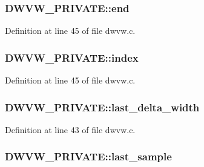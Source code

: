 \subsubsection[{\texorpdfstring{end}{end}}]{ D\+W\+V\+W\+\_\+\+P\+R\+I\+V\+A\+T\+E\+::end}\hypertarget{struct_d_w_v_w___p_r_i_v_a_t_e_ae13ae688a730d817b60480d55f5f114c}{}\label{struct_d_w_v_w___p_r_i_v_a_t_e_ae13ae688a730d817b60480d55f5f114c}


Definition at line 45 of file dwvw.\+c.

\subsubsection[{\texorpdfstring{index}{index}}]{ D\+W\+V\+W\+\_\+\+P\+R\+I\+V\+A\+T\+E\+::index}\hypertarget{struct_d_w_v_w___p_r_i_v_a_t_e_a0d919a53fe2f46ccd0823a684d42388e}{}\label{struct_d_w_v_w___p_r_i_v_a_t_e_a0d919a53fe2f46ccd0823a684d42388e}


Definition at line 45 of file dwvw.\+c.

\subsubsection[{\texorpdfstring{last\+\_\+delta\+\_\+width}{last_delta_width}}]{ D\+W\+V\+W\+\_\+\+P\+R\+I\+V\+A\+T\+E\+::last\+\_\+delta\+\_\+width}\hypertarget{struct_d_w_v_w___p_r_i_v_a_t_e_a18a3aa36273d607e568b4d61e725cb5d}{}\label{struct_d_w_v_w___p_r_i_v_a_t_e_a18a3aa36273d607e568b4d61e725cb5d}


Definition at line 43 of file dwvw.\+c.

\subsubsection[{\texorpdfstring{last\+\_\+sample}{last_sample}}]{ D\+W\+V\+W\+\_\+\+P\+R\+I\+V\+A\+T\+E\+::last\+\_\+sample}\hypertarget{struct_d_w_v_w___p_r_i_v_a_t_e_af6f262767c5ecfce02eac59d263d3efb}{}\label{struct_d_w_v_w___p_r_i_v_a_t_e_af6f262767c5ecfce02eac59d263d3efb}


